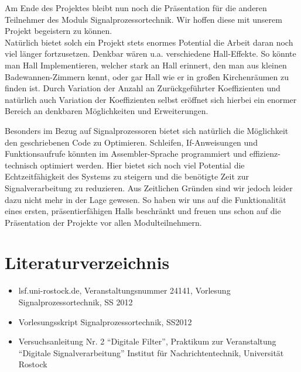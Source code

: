 \documentclass[a4paper,12pt,fontsize=12,DIV=12]{scrartcl}
\begin{document}
Am Ende des Projektes bleibt nun noch die Präsentation für die anderen Teilnehmer des Moduls Signalprozessortechnik. Wir hoffen diese mit unserem Projekt begeistern zu können.
\\

Natürlich bietet solch ein Projekt stets enormes Potential die Arbeit daran noch viel länger fortzusetzen. Denkbar wären u.a. verschiedene Hall-Effekte. So könnte man Hall Implementieren, welcher stark an Hall erinnert, den man aus kleinen Badewannen-Zimmern kennt, oder gar Hall wie er in großen Kirchenräumen zu finden ist. Durch Variation der Anzahl an Zurückgeführter Koeffizienten und natürlich auch Variation der Koeffizienten selbst eröffnet sich hierbei ein enormer Bereich an denkbaren Möglichkeiten und Erweiterungen.

Besonders im Bezug auf Signalprozessoren bietet sich natürlich die Möglichkeit den geschriebenen Code zu Optimieren. Schleifen, If-Anweisungen und Funktionsaufrufe könnten im Assembler-Sprache programmiert und effizienz-technisch optimiert werden.
Hier bietet sich noch viel Potential die Echtzeitfähigkeit des Systems zu steigern und die benötigte Zeit zur Signalverarbeitung zu reduzieren.
Aus Zeitlichen Gründen sind wir jedoch leider dazu nicht mehr in der Lage gewesen. So haben wir uns auf die Funktionalität eines ersten, präsentierfähigen Halls beschränkt und freuen uns schon auf die Präsentation der Projekte vor allen Modulteilnehmern.

\clearpage

\section{Literaturverzeichnis}
\vspace{1.5cm}
 \begin{itemize} 
\item lsf.uni-rostock.de, Veranstaltungsnummer 24141, Vorlesung Signalprozessortechnik, SS 2012
\item Vorlesungsskript Signalprozessortechnik, SS2012
\item Versuchsanleitung Nr. 2 "`Digitale Filter"', Praktikum zur Veranstaltung "`Digitale Signalverarbeitung"' Institut für Nachrichtentechnik, Universität Rostock
\end{itemize}
\end{document}
